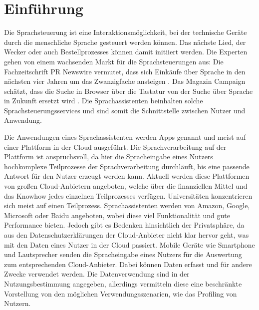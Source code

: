 \section{Einführung}
Die Sprachsteuerung ist eine Interaktionsmöglichkeit, bei der technische Geräte durch die menschliche Sprache gesteuert werden können. Das nächste Lied, der Wecker oder auch Bestellprozesses können damit initiiert werden.  Die Experten gehen von einem wachsenden Markt für die Sprachsteuerungen aus: Die Fachzeitschrift \glqq PR Newswire\grqq{} vermutet, dass sich Einkäufe über Sprache in den nächsten vier Jahren um das Zwanzigfache ansteigen \cite{prNewswire}. Das Magazin \glqq Campaign\grqq{} schätzt, dass die Suche in Browser über die Tastatur von der Suche über Sprache in Zukunft ersetzt wird \cite{Campaign}. Die Sprachassistenten beinhalten solche Sprachsteuerungsservices und sind somit die Schnittstelle zwischen Nutzer und Anwendung. 

Die Anwendungen eines Sprachassistenten werden Apps genannt und meist auf einer Plattform in der Cloud ausgeführt. Die Sprachverarbeitung auf der Plattform ist anspruchsvoll, da hier die Spracheingabe eines Nutzers hochkomplexe Teilprozesse der Sprachverarbeitung durchläuft, bis eine passende Antwort für den Nutzer erzeugt werden kann. Aktuell werden diese Plattformen von großen Cloud-Anbietern angeboten, welche über die finanziellen Mittel und das Knowhow jedes einzelnen Teilprozesses verfügen. Universitäten konzentrieren sich meist auf einen Teilprozess. Sprachassistenten werden von Amazon, Google, Microsoft oder Baidu angeboten, wobei diese viel Funktionalität und gute Performance bieten. Jedoch gibt es Bedenken hinsichtlich der Privatsphäre, da aus den Datenschutzerklärungen der Cloud-Anbieter nicht klar hervor geht, was mit den Daten eines Nutzer in der Cloud passiert. Mobile Geräte wie Smartphone und Lautsprecher senden die Spracheingabe eines Nutzers für die Auswertung zum entsprechenden Cloud-Anbieter. Dabei können Daten erfasst und für andere Zwecke verwendet werden. Die Datenverwendung sind in der Nutzungsbestimmung angegeben, allerdings vermitteln diese eine beschränkte Vorstellung von den möglichen Verwendungsszenarien, wie das Profiling von Nutzern. 

